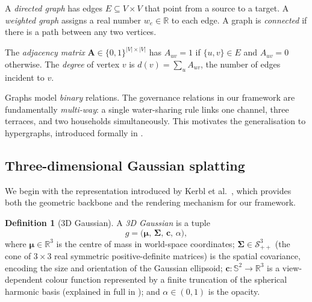 \documentclass[11pt,a4paper]{article}
\theoremstyle{plain}
\theoremstyle{definition}
\newtheorem{definition}[theorem]{Definition}
\theoremstyle{remark}
\begin{document}
A \emph{directed graph} has edges $E \subseteq V \times V$ that point
from a source to a target. A \emph{weighted graph} assigns a real
number $w_e \in \mathbb{R}$ to each edge. A graph is
\emph{connected} if there is a path between any two vertices.

The \emph{adjacency matrix} $\mathbf{A} \in \{0,1\}^{|V| \times |V|}$
has $A_{uv} = 1$ if $\{u,v\} \in E$ and $A_{uv} = 0$ otherwise.
The \emph{degree} of vertex $v$ is $d(v) = \sum_{u} A_{uv}$, the
number of edges incident to $v$.

Graphs model \emph{binary} relations. The governance relations in our
framework are fundamentally \emph{multi-way}: a single water-sharing
rule links one channel, three terraces, and two households
simultaneously. This motivates the generalisation to hypergraphs,
introduced formally in .

\subsection{Three-dimensional Gaussian splatting}
\label{sec:prelim_3dgs}

We begin with the representation introduced by Kerbl
et al.~\cite{kerbl2023gaussian}, which provides both the geometric
backbone and the rendering mechanism for our framework.

\begin{definition}[3D Gaussian]
\label{def:gaussian}
A \emph{3D Gaussian} is a tuple
\[
  g = \bigl({\boldsymbol\mu},\, {\boldsymbol\Sigma},\, \mathbf{c},\,
            \alpha\bigr),
\]
where ${\boldsymbol\mu} \in \mathbb{R}^3$ is the centre of mass in
world-space coordinates; ${\boldsymbol\Sigma} \in \mathcal{S}^3_{++}$
(the cone of $3\!\times\!3$ real symmetric positive-definite matrices)
is the spatial covariance, encoding the size and orientation of the
Gaussian ellipsoid; $\mathbf{c}: \mathbb{S}^2 \to \mathbb{R}^3$ is a
view-dependent colour function represented by a finite truncation of
the spherical harmonic basis (explained in full in
); and $\alpha \in (0, 1)$ is the opacity.
\end{definition}
\end{document}
